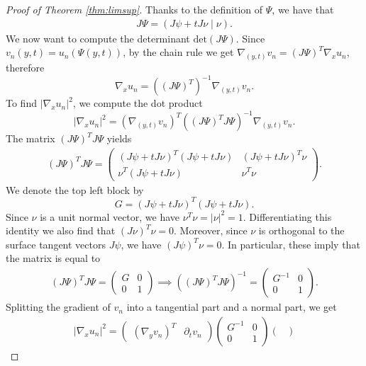 \documentclass[a4paper, 11pt, reqno]{amsart}
\theoremstyle{plain}
\theoremstyle{definition}
\theoremstyle{remark}
\begin{document}
\begin{proof}[Proof of Theorem \ref{thm:limsup}]
Thanks to the definition of $\Psi$, we have that
\begin{gather*}
    J \Psi = ( J \psi + t J \nu \; | \; \nu ).
\end{gather*}
We now want to compute the determinant $\mathrm{det}(J\Psi)$.
Since $v_n (y,t) = u_n (\Psi(y,t))$, by the chain rule we get $ \nabla_{(y,t)} v_n = (J \Psi)^T \nabla_x u_n $, therefore
$$ \nabla_x u_n = ((J \Psi)^{T})^{-1} \nabla_{(y,t)} v_n. $$
To find $| \nabla_x u_n |^2$, we compute the dot product
$$ | \nabla_x u_n |^2 = (\nabla_{(y,t)} v_n)^T ( (J\Psi)^T J\Psi)^{-1} \nabla_{(y,t)} v_n. $$
The matrix $ (J\Psi)^T J\Psi$ yields
\begin{gather*}
    (J\Psi)^T J\Psi = \begin{pmatrix}
        (J\psi + t J \nu)^T (J\psi + t J \nu) & (J\psi + t J \nu)^T \nu \\
        \nu^T (J\psi + t J \nu) & \nu^T \nu
    \end{pmatrix}.
\end{gather*}
We denote the top left block by 
\begin{equation}
    G = (J\psi + t J \nu)^T (J\psi + t J \nu).
\end{equation}
Since $\nu$ is a unit normal vector, we have $\nu^T \nu = |\nu|^2 = 1$. Differentiating this identity we also find that $(J\nu)^T \nu = 0$. Moreover, since $\nu $ is orthogonal to the surface tangent vectors $J \psi$, we have $(J\psi)^T \nu = 0$. In particular, these imply that the matrix is equal to
\begin{gather*}
    (J\Psi)^T J\Psi = \begin{pmatrix}
        G & 0 \\
        0 & 1
    \end{pmatrix} \implies ((J\Psi)^T J\Psi)^{-1} = \begin{pmatrix}
        G^{-1} & 0 \\
        0 & 1
    \end{pmatrix}.
\end{gather*}
Splitting the gradient of $v_n$ into a tangential part and a normal part, we get
\begin{gather}
    | \nabla_x u_n |^2 = \begin{pmatrix}
        ( \nabla_y v_n)^T & \partial_t v_n
    \end{pmatrix} \begin{pmatrix}
        G^{-1} & 0 \\ 0 & 1
    \end{pmatrix} \begin{pmatrix}

\end{pmatrix}
\end{gather}
\end{proof}
\end{document}
